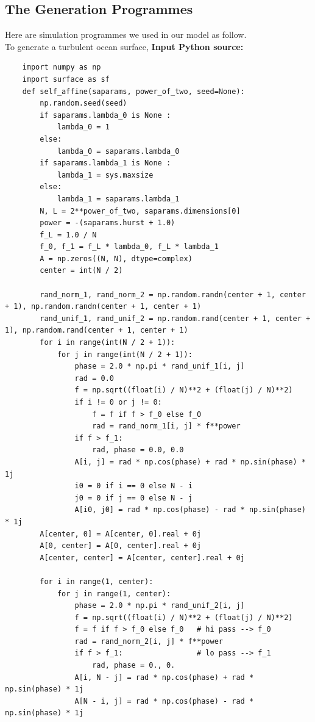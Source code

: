 \documentclass{mcmthesis}
\begin{document}
\newpage
\begin{appendices}

  \section{The Generation Programmes}

    Here are simulation programmes we used in our model as follow.\\
    To generate a turbulent ocean surface,
    \textbf{\textcolor[rgb]{0.98,0.00,0.00}{Input Python source:}}

\lstset{language = Python}
\begin{lstlisting}
    import numpy as np
    import surface as sf
    def self_affine(saparams, power_of_two, seed=None):
        np.random.seed(seed)
        if saparams.lambda_0 is None :
        	lambda_0 = 1
        else:
        	lambda_0 = saparams.lambda_0
       	if saparams.lambda_1 is None :
       		lambda_1 = sys.maxsize
       	else:
       		lambda_1 = saparams.lambda_1
        N, L = 2**power_of_two, saparams.dimensions[0]
        power = -(saparams.hurst + 1.0)
        f_L = 1.0 / N
        f_0, f_1 = f_L * lambda_0, f_L * lambda_1
        A = np.zeros((N, N), dtype=complex)
        center = int(N / 2)

        rand_norm_1, rand_norm_2 = np.random.randn(center + 1, center + 1), np.random.randn(center + 1, center + 1)
        rand_unif_1, rand_unif_2 = np.random.rand(center + 1, center + 1), np.random.rand(center + 1, center + 1)
        for i in range(int(N / 2 + 1)):
            for j in range(int(N / 2 + 1)):
                phase = 2.0 * np.pi * rand_unif_1[i, j]
                rad = 0.0
                f = np.sqrt((float(i) / N)**2 + (float(j) / N)**2)
                if i != 0 or j != 0:
                    f = f if f > f_0 else f_0
                    rad = rand_norm_1[i, j] * f**power
                if f > f_1:
                    rad, phase = 0.0, 0.0
                A[i, j] = rad * np.cos(phase) + rad * np.sin(phase) * 1j
                i0 = 0 if i == 0 else N - i
                j0 = 0 if j == 0 else N - j
                A[i0, j0] = rad * np.cos(phase) - rad * np.sin(phase) * 1j
        A[center, 0] = A[center, 0].real + 0j
        A[0, center] = A[0, center].real + 0j
        A[center, center] = A[center, center].real + 0j

        for i in range(1, center):
            for j in range(1, center):
                phase = 2.0 * np.pi * rand_unif_2[i, j]
                f = np.sqrt((float(i) / N)**2 + (float(j) / N)**2)
                f = f if f > f_0 else f_0   # hi pass --> f_0
                rad = rand_norm_2[i, j] * f**power
                if f > f_1:                 # lo pass --> f_1
                    rad, phase = 0., 0.
                A[i, N - j] = rad * np.cos(phase) + rad * np.sin(phase) * 1j
                A[N - i, j] = rad * np.cos(phase) - rad * np.sin(phase) * 1j


\end{lstlisting}
\end{appendices}
\end{document}
